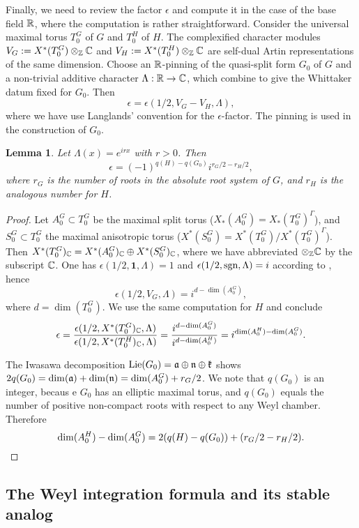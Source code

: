 \documentclass{article}
\newtheorem{lem}[thm]{Lemma}
\theoremstyle{definition}
\numberwithin{equation}{section}
\renewcommand{\-}{\hyp{}}
\begin{document}
Finally, we  need to review the factor $\epsilon$ and compute it in the case of the base field $\mathbb{R}$, where the computation is rather straightforward. Consider the universal maximal torus $T_0^G$ of $G$ and $T_0^H$ of $H$. The complexified character modules $V_G := X^*(T_0^G)\otimes_{\mathbb{Z}}\mathbb{C}$ and $V_H := X^*(T_0^H)\otimes_{\mathbb{Z}}\mathbb{C}$ are self-dual Artin representations of the same dimension. Choose an $\mathbb{R}$-pinning of the quasi-split form $G_0$ of $G$ and a non-trivial additive character $\Lambda : \mathbb{R} \to \mathbb{C}$, which combine to give the Whittaker datum fixed for $G_0$. Then
\[ \epsilon = \epsilon(1/2,V_G-V_H,\Lambda), \]
where we have use Langlands' convention \cite[(3.6.4)]{TateCor} for the $\epsilon$-factor. The pinning is used in the construction of $G_0$.


\begin{lem} \label{lem:epsilon}
Let $\Lambda(x)=e^{irx}$ with $r>0$. Then
\[ \epsilon = (-1)^{q(H)-q(G_0)}i^{r_G/2-r_H/2}, \]
where $r_G$ is the number of roots in the absolute root system of $G$, and $r_H$ is the analogous number for $H$.
\end{lem}
\begin{proof}
Let $A_0^G \subset T_0^G$ be the maximal split torus ($X_*(A_0^G)=X_*(T_0^G)^\Gamma$), and $S_0^G \subset T_0^G$ the maximal anisotropic torus ($X^*(S_0^G)=X^*(T_0^G)/X^*(T_0^G)^\Gamma$). Then $X^*(T_0^G)_{\mathbb{C}}=X^*(A_0^G)_{\mathbb{C}} \oplus X^*(S_0^G)_{\mathbb{C}}$, where we have abbreviated $\otimes_{\mathbb{Z}}\mathbb{C}$ by the subscript $\mathbb{C}$. One has $\epsilon(1/2,\textbf{1},\Lambda)=1$ and $\epsilon(1/2,\textrm{sgn},\Lambda)=i$ according to \cite[(3.2.4)]{TateCor}, hence
\[ \epsilon(1/2,V_G,\Lambda)=i^{d-\dim(A_0^G)}, \]
where $d=\dim(T_0^G)$. We use the same computation for $H$ and conclude
\[ \epsilon=\frac{\epsilon(1/2,X^*(T_0^G)_{\mathbb{C}},\Lambda)}{\epsilon(1/2,X^*(T_0^H)_{\mathbb{C}},\Lambda)} = \frac{i^{d-\dim(A_0^G)}}{i^{d-\dim(A_0^H)}}=i^{\dim(A_0^H)-\dim(A_0^G)}. \]

The Iwasawa decomposition $\textrm{Lie}(G_0)=\mathfrak{a} \oplus\mathfrak{n} \oplus \mathfrak{k}$ shows  $2q(G_0)=\dim(\mathfrak{a})+\dim(\mathfrak{n})=\dim(A_0^G)+r_G/2$. We note that $q(G_0)$ is an integer, becaus e $G_0$ has an elliptic maximal torus, and $q(G_0)$ equals the number of positive non-compact roots with respect to any Weyl chamber. Therefore
\[ \dim(A_0^H)-\dim(A_0^G) = 2(q(H)-q(G_0))+(r_G/2-r_H/2).\qedhere \]
\end{proof}


\subsection{The Weyl integration formula and its stable analog} \label{sub:weylint}
\end{document}
